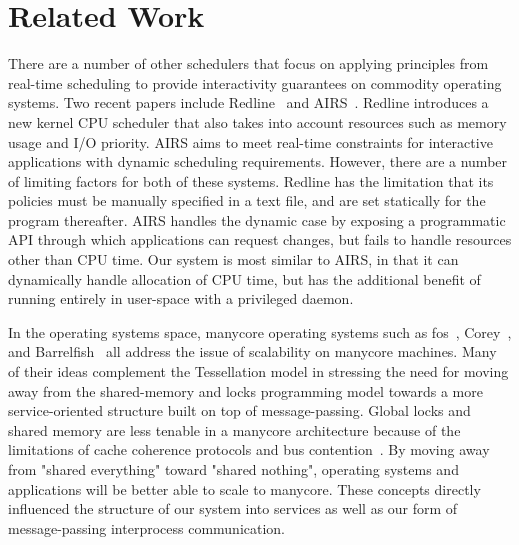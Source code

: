\documentclass[letterpaper,twocolumn,11pt]{article}
\begin{document}
\section{Related Work}

There are a number of other schedulers that focus on applying principles from real-time scheduling to provide interactivity guarantees on commodity operating systems. Two recent papers include Redline~\cite{DBLP:conf/osdi/YangLBKM08} and AIRS~\cite{DBLP:conf/osdi/YangLBKM08}. Redline introduces a new kernel CPU scheduler that also takes into account resources such as memory usage and I/O priority. AIRS aims to meet real-time constraints for interactive applications with dynamic scheduling requirements. However, there are a number of limiting factors for both of these systems. Redline has the limitation that its policies must be manually specified in a text file, and are set statically for the program thereafter. AIRS handles the dynamic case by exposing a programmatic API through which applications can request changes, but fails to handle resources other than CPU time. Our system is most similar to AIRS, in that it can dynamically handle allocation of CPU time, but has the additional benefit of running entirely in user-space with a privileged daemon.


In the operating systems space, manycore operating systems such as fos~\cite{Wentzlaff:2009:FOS:1531793.1531805}, Corey~\cite{Boyd-Wickizer:2008:COS:1855741.1855745}, and Barrelfish~\cite{Schüpbach08embracingdiversity} all address the issue of scalability on manycore machines. Many of their ideas complement the Tessellation model in stressing the need for moving away from the shared-memory and locks programming model towards a more service-oriented structure built on top of message-passing. Global locks and shared memory are less tenable in a manycore architecture because of the limitations of cache coherence protocols and bus contention~\cite{linux:osdi10}. By moving away from "shared everything" toward "shared nothing", operating systems and applications will be better able to scale to manycore. These concepts directly influenced the structure of our system into services as well as our form of message-passing interprocess communication.
\end{document}

